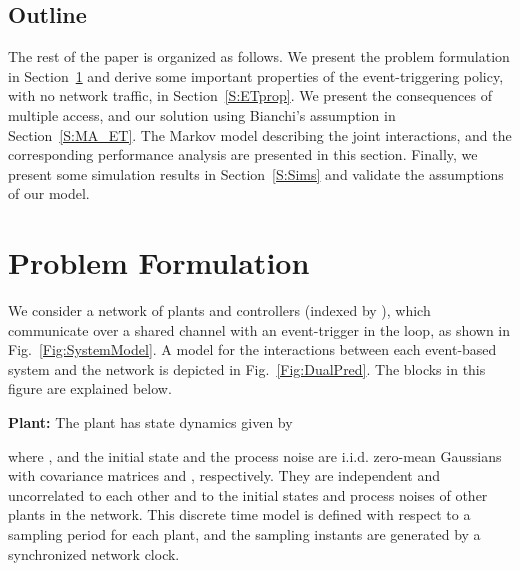 \documentclass[journal]{IEEEtran}
\begin{document}
\subsection{Outline}
The rest of the paper is organized as follows. We present the problem formulation in Section~\ref{S:Problem} and derive some important properties of the event-triggering policy, with no network traffic, in Section~\ref{S:ETprop}. We present the consequences of multiple access, and our solution using Bianchi's assumption in Section~\ref{S:MA_ET}. The Markov model describing the joint interactions, and the corresponding performance analysis are presented in this section. Finally, we present some simulation results in Section~\ref{S:Sims} and validate the assumptions of our model.

\section{Problem Formulation} \label{S:Problem}

We consider a network of  plants and controllers (indexed by ), which communicate over a shared channel with an event-trigger in the loop, as shown in Fig.~\ref{Fig:SystemModel}. A model for the interactions between each event-based system and the network is depicted in Fig.~\ref{Fig:DualPred}. The blocks in this figure are explained below.

\noindent \textbf{Plant: } The plant  has state dynamics given by

where ,  and the initial state  and the process noise  are i.i.d. zero-mean Gaussians with covariance matrices  and , respectively. They are independent and uncorrelated to each other and to the initial states and process noises of other plants in the network. This discrete time model is defined with respect to a sampling period  for each plant, and the sampling instants are generated by a synchronized network clock.
\end{document}
